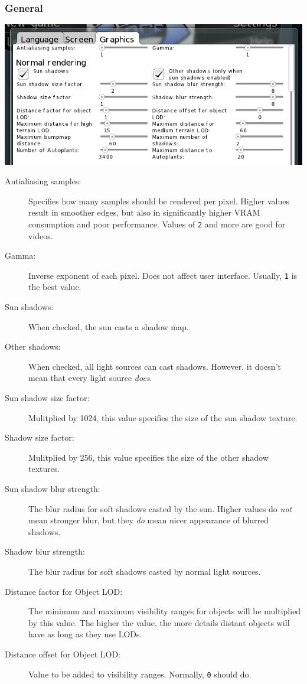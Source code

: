 \documentclass[a4paper]{article}
\newcommand{\cvalue}[1]{\texttt{#1}}
\begin{document}
\subsubsection{General}
\includegraphics[width=140mm]{./images/settings-general.png}
\begin{description}
  \item[Antialiasing samples:] Specifies how many samples should be rendered per pixel. Higher values result in smoother edges, but
    also in significantly higher VRAM consumption and poor performance. Values of \cvalue{2} and more are good for videos.
  \item[Gamma:] Inverse exponent of each pixel. Does not affect user interface. Usually, \cvalue{1} is the best value.
  \item[Sun shadows:] When checked, the sun casts a shadow map.
  \item[Other shadows:] When checked, all light sources can cast shadows. However, it doesn't mean that every light source \emph{does}.
  \item[Sun shadow size factor:] Mulitplied by 1024, this value specifies the size of the sun shadow texture.
  \item[Shadow size factor:] Mulitplied by 256, this value specifies the size of the other shadow textures.
  \item[Sun shadow blur strength:] The blur radius for soft shadows casted by the sun. Higher values do \emph{not} mean stronger blur, but they \emph{do} mean nicer appearance of blurred shadows.
  \item[Shadow blur strength:] The blur radius for soft shadows casted by normal light sources.
  \item[Distance factor for Object LOD:] The minimum and maximum visibility ranges for objects will be multiplied by this value. The higher the value, the more details distant objects will have as long as they use LODs.
  \item[Distance offset for Object LOD:] Value to be added to visibility ranges. Normally, \cvalue{0} should do.

\end{description}
\end{document}
